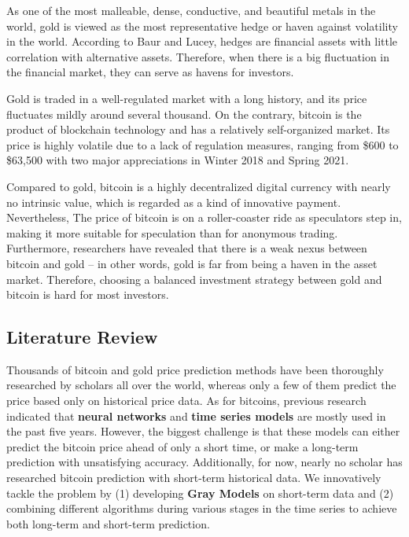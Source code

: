 \documentclass{mcmthesis}
\begin{document}
	As one of the most malleable, dense, conductive, and beautiful metals in the world, gold is viewed as the most representative hedge or haven against volatility in the world. According to Baur and Lucey, hedges are financial assets with little correlation with alternative assets. Therefore, when there is a big fluctuation in the financial market, they can serve as havens for investors. 
	
	Gold is traded in a well-regulated market with a long history, and its price fluctuates mildly around several thousand. On the contrary, bitcoin is the product of blockchain technology and has a relatively self-organized market. Its price is highly volatile due to a lack of regulation measures, ranging from \$600 to \$63,500 with two major appreciations in Winter 2018 and Spring 2021. 
	
	Compared to gold, bitcoin is a highly decentralized digital currency with nearly no intrinsic value, which is regarded as a kind of innovative payment. Nevertheless, The price of bitcoin is on a roller-coaster ride as speculators step in, making it more suitable for speculation than for anonymous trading. Furthermore, researchers have revealed that there is a weak nexus between bitcoin and gold -- in other words, gold is far from being a haven in the asset market. Therefore, choosing a balanced investment strategy between gold and bitcoin is hard for most investors. 
	
	\subsection{Literature Review}
	
	Thousands of bitcoin and gold price prediction methods have been thoroughly researched by scholars all over the world, whereas only a few of them predict the price based only on historical price data. As for bitcoins, previous research indicated that \textbf{neural networks} \cite{NN} and \textbf{time series models} \cite{TSA} are mostly used in the past five years. However, the biggest challenge is that these models can either predict the bitcoin price ahead of only a short time, or make a long-term prediction with unsatisfying accuracy. Additionally, for now, nearly no scholar has researched bitcoin prediction with short-term historical data. We innovatively tackle the problem by (1) developing \textbf{Gray Models} on short-term data and (2) combining different algorithms during various stages in the time series to achieve both long-term and short-term prediction. 
	
\end{document}
